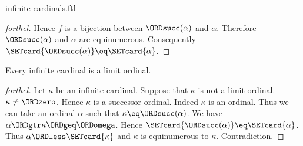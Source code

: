 \documentclass{stex}
\begin{document}
\begin{smodule}{infinite-cardinals.ftl}
\begin{proof}[forthel]
  Hence $f$ is a bijection between $\ORDsucc(\alpha)$ and $\alpha$.
  Therefore $\ORDsucc(\alpha)$ and $\alpha$ are equinumerous.
  Consequently $\SETcard{\ORDsucc(\alpha)} \eq \SETcard{\alpha}$.
\end{proof}

\begin{proposition}[forthel,id=SET_THEORY_07_8700732632989696]
  Every infinite cardinal is a limit ordinal.
\end{proposition}
\begin{proof}[forthel]
  Let $\kappa$ be an infinite cardinal.
  Suppose that $\kappa$ is not a limit ordinal.
  $\kappa \neq \ORDzero$.
  Hence $\kappa$ is a successor ordinal.
  Indeed $\kappa$ is an ordinal.
  Thus we can take an ordinal $\alpha$ such that $\kappa \eq \ORDsucc(\alpha)$.
  We have $\alpha \ORDgtr \kappa \ORDgeq \ORDomega$.
  Hence $\SETcard{\ORDsucc(\alpha)} \eq \SETcard{\alpha}$.
  Thus $\alpha \ORDless \SETcard{\kappa}$ and $\kappa$ is equinumerous to $\kappa$.
  Contradiction.
\end{proof}
\end{smodule}
\end{document}
